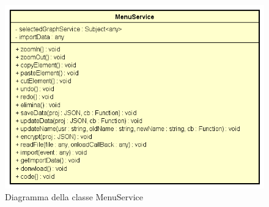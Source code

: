 \begin{figure}[h!]
	\centering
	\includegraphics[scale=0.8]{res/sections/SpecificaFrontEnd/Services/Disegnetti/menu.png}
	\caption{Diagramma della classe MenuService}
\end{figure}

